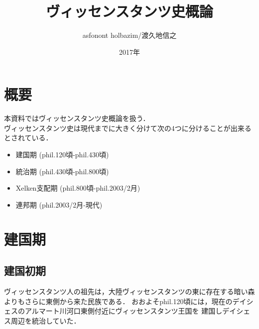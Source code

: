 \documentclass[a4paper,xelatex,ja=standard]{bxjsarticle}
\begin{document}
{
\title{\Huge ヴィッセンスタンツ史概論}
\author{asfonont holbazim/渡久地信之}
\date{2017年}
}
\maketitle
\thispagestyle{empty}


\newpage

\tableofcontents

\newpage
{}

\section{概要}
本資料ではヴィッセンスタンツ史概論を扱う．\\
ヴィッセンスタンツ史は現代までに大きく分けて次の4つに分けることが出来るとされている．
\begin{itemize}
 \item 建国期 (phil.120頃-phil.430頃)
 \item 統治期 (phil.430頃-phil.800頃)
 \item Xelken支配期 (phil.800頃-phil.2003/2月)
 \item 連邦期 (phil.2003/2月-現代)
\end{itemize}

\section{建国期}
\subsection{建国初期}
ヴィッセンスタンツ人の祖先は，大陸ヴィッセンスタンツの東に存在する暗い森よりもさらに東側から来た民族である．
おおよそphil.120頃には，現在のデイシェスのアルマート川河口東側付近にヴィッセンスタンツ王国を
建国しデイシェス周辺を統治していた．
\end{document}
